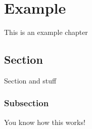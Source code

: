 \chapter{Example}
This is an example chapter

\section{Section}
Section and stuff

\subsection{Subsection}
You know how this works!